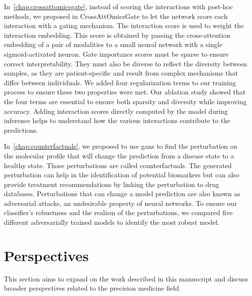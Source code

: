 \documentclass[../main.tex]{subfiles}
\begin{document}
	In~\cref{chap:crossattomicsgate}, instead of scoring the interactions with post-hoc methods, we proposed in CrossAttOmicsGate to let the network score each interaction with a gating mechanism.
	The interaction score is used to weight the interaction embedding.
	This score is obtained by passing the cross-attention embedding of a pair of modalities to a small neural network with a single sigmoid-activated neuron.
	Gate importance scores must be sparse to ensure correct interpretability. They must also be diverse to reflect the diversity between samples, as they are patient-specific and result from complex mechanisms that differ between individuals.
	We added four regularization terms to our training process to ensure these two properties were met.
	Our ablation study showed that the four terms are essential to ensure both sparsity and diversity while improving accuracy.
	Adding interaction scores directly computed by the model during inference helps to understand how the various interactions contribute to the predictions.

	In~\cref{chap:counterfactuals}, we proposed to use \glspl{gan} to find the perturbation on the molecular profile that will change the prediction from a disease state to a healthy state.
	Those perturbations are called counterfactuals.
	The generated perturbation can help in the identification of potential biomarkers but can also provide treatment recommendations by linking the perturbation to drug databases.
	Perturbations that can change a model prediction are also known as adversarial attacks, an undesirable property of neural networks.
	To ensure our classifier's robustness and the realism of the perturbations, we compared five different adversarially trained models to identify the most robust model.

\section{Perspectives}
	This section aims to expand on the work described in this manuscript and discuss broader perspectives related to the precision medicine field.
\end{document}
